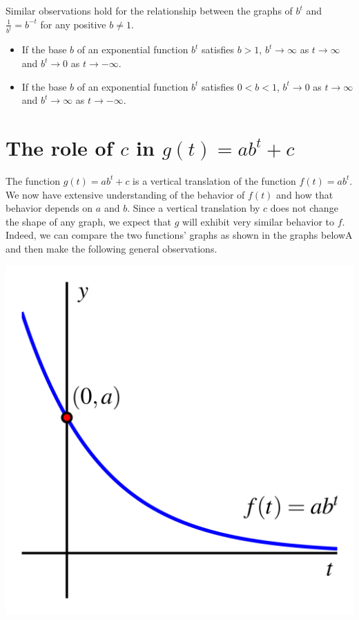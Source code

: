 \documentclass[nooutcomes]{ximera}
\begin{document}
Similar observations hold for the relationship between the graphs of $b^{t}$ and $\frac{1}{b^t} = b^{-t}$ for any positive $b \ne 1$.

\begin{summary}
\begin{itemize}
\item If the base $b$ of an exponential function $b^t$ satisfies $b>1$, $b^t \to \infty$ as $t \to \infty$ and $b^t \to 0$ as $t \to -\infty$.

\item If the base $b$ of an exponential function $b^t$ satisfies $0<b<1$, $b^t \to 0$ as $t \to \infty$ and $b^t \to \infty$ as $t \to -\infty$.
\end{itemize}
\end{summary}



\section{The role of $c$ in $g(t) = ab^t + c$}

The function $g(t) = ab^t + c$ is a vertical translation of the function $f(t) = ab^t$.  We now have extensive understanding of the behavior of $f(t)$ and how that behavior depends on $a$ and $b$.  Since a vertical translation by $c$ does not change the shape of any graph, we expect that $g$ will exhibit very similar behavior to $f$.  Indeed, we can compare the two functions' graphs as shown in the graphs belowA and then make the following general observations.

\begin{image}
\includegraphics{modeling-vert-transl-0.jpg}
\end{image}
\end{document}
